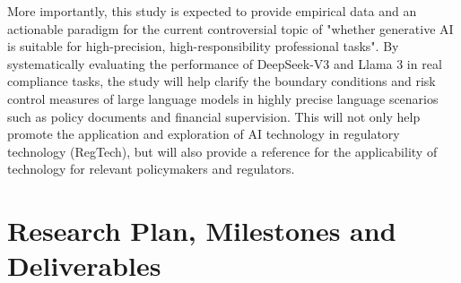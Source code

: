 \documentclass[a4paper,11pt]{article}
\begin{document}
More importantly, this study is expected to provide empirical data and an actionable paradigm for the current controversial topic of "whether generative AI is suitable for high-precision, high-responsibility professional tasks". By systematically evaluating the performance of DeepSeek-V3 and Llama 3 in real compliance tasks, the study will help clarify the boundary conditions and risk control measures of large language models in highly precise language scenarios such as policy documents and financial supervision. This will not only help promote the application and exploration of AI technology in regulatory technology (RegTech), but will also provide a reference for the applicability of technology for relevant policymakers and regulators.

\section{Research Plan, Milestones and Deliverables}

\end{document}
